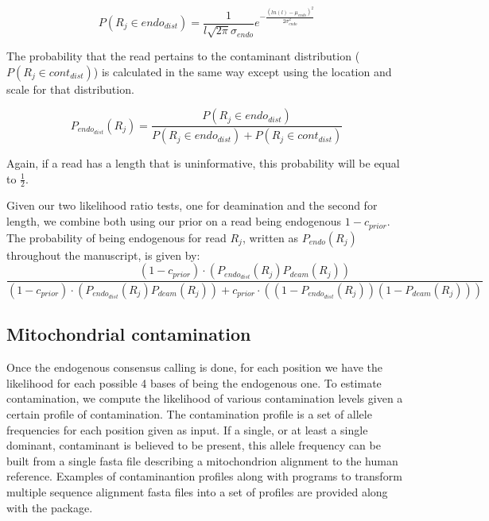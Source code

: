 \documentclass[a4paper,12pt]{article}
\begin{document}
\begin{equation}
P(R_j \in endo_{dist}) = \frac {1} {l \sqrt{2\pi} \sigma_{endo}} e^{ - \frac{(ln(l) - \mu_{endo})^2 }  {2 \sigma_{endo}^2} } 
\end{equation}

\noindent The probability that the read pertains to the contaminant distribution ($P(R_j \in cont_{dist})$) is calculated in the same way except using the location and scale for that distribution. 

\begin{equation}
P_{endo_{dist} }(R_j) = \frac {P(R_j \in endo_{dist})} {P(R_j \in endo_{dist}) + P(R_j \in cont_{dist})}
\end{equation}

\noindent Again, if a read has a length that is uninformative, this probability will be equal to $\frac {1} {2}$.


Given our two likelihood ratio tests, one for deamination and the second for length, we combine both using our prior on a read being endogenous $1-c_{prior}$. The probability of being endogenous for read $R_j$, written as $P_{endo} (R_j)$ throughout the manuscript, is given by:
{\small
\begin{equation}
 \frac {  (1-c_{prior}) \cdot ( P_{endo_{dist} }(R_j) P_{deam}(R_j) ) } {  (1-c_{prior}) \cdot ( P_{ endo_{dist} }(R_j) P_{deam}(R_j)) + c_{prior} \cdot ( (1-P_{endo_{dist} }(R_j)) (1- P_{deam}(R_j) )) }
\end{equation}
}







\subsection{Mitochondrial contamination}
\label{sec:contest}

Once the endogenous consensus calling is done, for each position we have the likelihood for each possible 4 bases of being the endogenous one. To estimate contamination, we compute the likelihood of various contamination levels given a certain profile of contamination. The contamination profile is a set of allele frequencies for each position given as input. If a single, or at least a single dominant, contaminant is believed to be present, this allele frequency can be built from a single fasta file describing a mitochondrion alignment to the human reference.  Examples of contaminantion profiles along with programs to transform multiple sequence alignment fasta files into a set of profiles are provided along with the package. 
\end{document}
